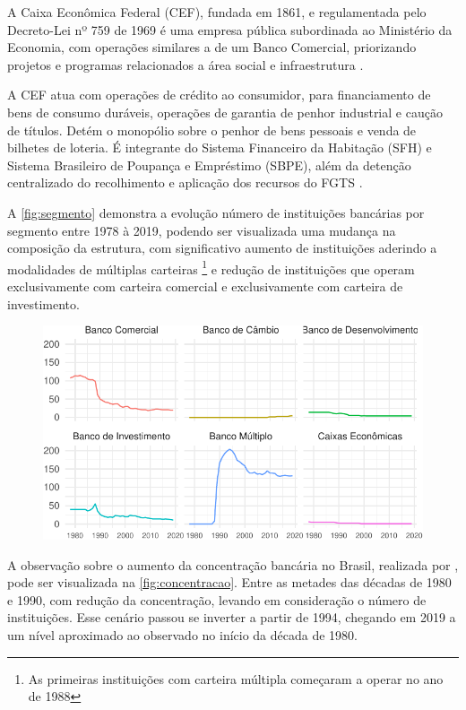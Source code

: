 \documentclass[12pt,12pt,openright,oneside,a4paper,chapter=TITLE,section=TITLE,subsection=TITLE,subsubsection=TITLE,english,french,spanish,portugues,sumario=tradicional]{abntex2}
\begin{document}
A Caixa Econômica Federal (CEF), fundada em 1861, e regulamentada pelo
Decreto-Lei nº 759 de 1969 é uma empresa pública subordinada ao Ministério da
Economia, com operações similares a de um Banco Comercial, priorizando projetos
e programas relacionados a área social e infraestrutura \cite{DL:759:1969}.

A CEF atua com operações de crédito ao consumidor, para financiamento de bens
de consumo duráveis, operações de garantia de penhor industrial e caução de
títulos. Detém o monopólio sobre o penhor de bens pessoais e venda de bilhetes
de loteria. É integrante do Sistema Financeiro da Habitação (SFH) e Sistema
Brasileiro de Poupança e Empréstimo (SBPE), além da detenção centralizado do
recolhimento e aplicação dos recursos do FGTS \cite{DL:759:1969}.

A \autoref{fig:segmento} demonstra a evolução número de instituições bancárias
por segmento entre 1978 à 2019, podendo ser visualizada uma mudança na
composição da estrutura, com significativo aumento de instituições aderindo a
modalidades de múltiplas carteiras \footnote{As primeiras instituições com
carteira múltipla começaram a operar no ano de 1988} e redução de instituições que operam exclusivamente com carteira comercial e exclusivamente com carteira
de investimento.

\begin{figure}

\begin{center}\includegraphics{12-exportedfigures/bank evolution-1} \end{center}
\label{fig:segmento}
\end{figure}

A observação sobre o aumento da concentração bancária no Brasil, realizada por
\textcite{camargo:2009}, pode ser visualizada na \autoref{fig:concentracao}.
Entre as metades das décadas de 1980 e 1990, com redução da concentração,
levando em consideração o número de instituições. Esse cenário passou se
inverter a partir de 1994, chegando em 2019 a um nível aproximado ao observado
no início da década de 1980.
\end{document}
